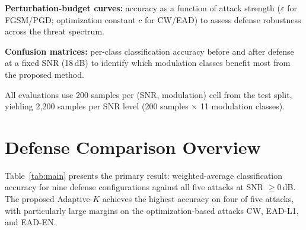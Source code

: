 \textbf{Perturbation-budget curves:} accuracy as a function of attack
strength ($\varepsilon$ for FGSM/PGD; optimization constant $c$ for
CW/EAD) to assess defense robustness across the threat spectrum.

\textbf{Confusion matrices:} per-class classification accuracy before and
after defense at a fixed SNR (18\,dB) to identify which modulation classes
benefit most from the proposed method.

All evaluations use 200 samples per (SNR, modulation) cell from the test
split, yielding 2{,}200 samples per SNR level
(200 samples $\times$ 11 modulation classes).

\section{Defense Comparison Overview}

Table~\ref{tab:main} presents the primary result: weighted-average
classification accuracy for nine defense configurations against all five
attacks at SNR $\geq 0$\,dB. The proposed Adaptive-$K$ achieves the
highest accuracy on four of five attacks, with particularly large margins
on the optimization-based attacks CW, EAD-L1, and EAD-EN.

